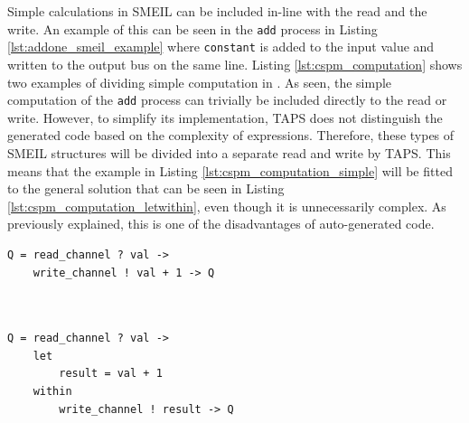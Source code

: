 Simple calculations in SMEIL can be included in-line with the read and the write. An example of this can be seen in the \texttt{add} process in Listing \ref{lst:addone_smeil_example} where \texttt{constant} is added to the input value and written to the output bus on the same line.
Listing \ref{lst:cspm_computation} shows two examples of dividing simple computation in \cspm{}.
As seen, the simple computation of the \texttt{add} process can trivially be included directly to the read or write.
However, to simplify its implementation, TAPS does not distinguish the generated code based on the complexity of expressions.
Therefore, these types of SMEIL structures will be divided into a separate read and write by TAPS.
This means that the example in Listing \ref{lst:cspm_computation_simple} will be fitted to the general solution that can be seen in Listing \ref{lst:cspm_computation_letwithin}, even though it is unnecessarily complex. As previously explained, this is one of the disadvantages of auto-generated code.\\
\begin{minipage}[t]{.98\linewidth}
    \centering
\begin{minipage}[t]{0.45\linewidth}
\begin{verbatim}
Q = read_channel ? val ->
    write_channel ! val + 1 -> Q



\end{verbatim}
  \label{lst:cspm_computation_simple}
\end{minipage}
\hspace{0.6cm}
\begin{minipage}[t]{0.45\linewidth}
\begin{verbatim}
Q = read_channel ? val ->
    let
        result = val + 1
    within
        write_channel ! result -> Q
\end{verbatim}
\label{lst:cspm_computation_letwithin}
\end{minipage}
\vspace{0.3cm}
\label{lst:cspm_computation}
\vspace{1cm}
\end{minipage}

